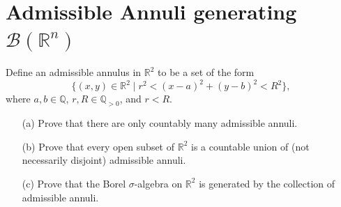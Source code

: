 \documentclass[lang=cn,11pt]{elegantbook}
\begin{document}
\section{Admissible Annuli generating $\mathcal{B}(\mathbb{R}^n)$} 
Define an admissible annulus in $\mathbb{R}^2$ to be a set of the form
\[
\{(x, y) \in \mathbb{R}^2 \mid r^2 < (x - a)^2 + (y - b)^2 < R^2\},
\]
where $a, b \in \mathbb{Q}$, $r, R \in \mathbb{Q}_{>0}$, and $r < R$.

\begin{itemize}
    \item[(a)] Prove that there are only countably many admissible annuli.
    \item[(b)] Prove that every open subset of $\mathbb{R}^2$ is a countable union of (not necessarily disjoint) admissible annuli.
    \item[(c)] Prove that the Borel $\sigma$-algebra on $\mathbb{R}^2$ is generated by the collection of admissible annuli.
\end{itemize}
\end{document}
